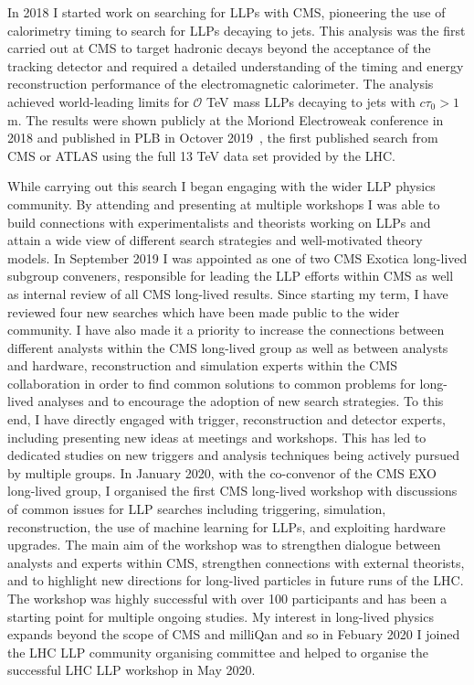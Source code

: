 \documentclass[11pt]{article}
\theoremstyle{plain} \numberwithin{equation}{section}
\theoremstyle{definition}
\newcounter{list}
\begin{document}
In 2018 I started work on searching for LLPs with CMS, 
pioneering the use of calorimetry timing to search for LLPs decaying to jets. This analysis was the first carried 
out at CMS to target hadronic decays beyond the acceptance of the tracking detector and required a detailed
understanding of the timing and energy reconstruction performance of the electromagnetic calorimeter. The analysis achieved 
world-leading limits for $\mathcal{O}$ TeV mass LLPs decaying to jets with $c\tau_{0} > 1$ m. 
The results were shown publicly at the Moriond Electroweak conference in 2018 and published in PLB in Octover 2019~\cite{2019134876}, 
the first published search from CMS or ATLAS using the full 13 TeV data set provided by the LHC. 

While carrying out this search I began engaging with the wider LLP physics community. 
By attending and presenting at multiple workshops I was able to build connections with 
experimentalists and theorists working on LLPs and attain a wide view of different 
search strategies and well-motivated theory models. In September 2019 I was appointed as
one of two CMS Exotica long-lived subgroup conveners, responsible for leading the 
LLP efforts within CMS as well as internal review of all CMS long-lived results. Since starting
my term, I have reviewed four new searches which have been made public to the wider community.
I have also made it a priority to increase the connections between different analysts within the
CMS long-lived group as well as between analysts and hardware, reconstruction 
and simulation experts within the CMS collaboration in order to find common solutions to 
common problems for long-lived analyses and to encourage the
adoption of new search strategies. To this end, I have directly engaged with
trigger, reconstruction and detector experts, including presenting new ideas at
meetings and workshops. This has led to dedicated studies on new triggers and 
analysis techniques being actively pursued by multiple groups. 
In January 2020, with the co-convenor of the CMS EXO long-lived group, I 
organised the first CMS long-lived workshop with discussions 
of common issues for LLP searches including triggering, simulation, reconstruction, 
the use of machine learning for LLPs, and exploiting hardware upgrades. 
The main aim of the workshop was to strengthen dialogue between analysts and experts within CMS,
strengthen connections with external theorists, and to highlight new directions 
for long-lived particles in future runs of the LHC.  
The workshop was highly successful with over 100 participants and has been a starting 
point for multiple ongoing studies. My interest in long-lived physics expands beyond the scope of CMS
and milliQan and so in Febuary 2020 I joined the LHC LLP community organising committee 
and helped to organise the successful LHC LLP workshop in May 2020.
\end{document}
